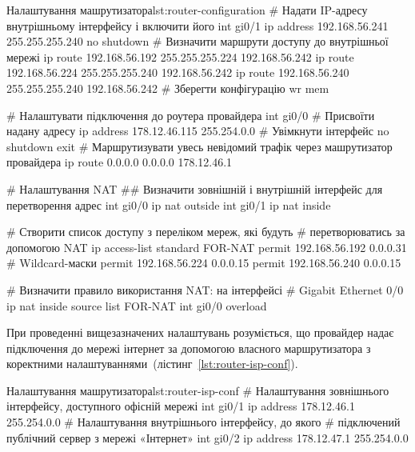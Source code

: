 \documentclass[
  ukrainian,
  simple,
  floatsection,
]{eskdnaukvd}
\begin{document}
      \begin{listingplaintext}{Налаштування машрутизатора}{lst:router-configuration}
        # Надати IP-адресу внутрішньому інтерфейсу і включити його
        int gi0/1
        ip address 192.168.56.241 255.255.255.240
        no shutdown
        # Визначити маршрути доступу до внутрішньої мережі
        ip route 192.168.56.192 255.255.255.224 192.168.56.242
        ip route 192.168.56.224 255.255.255.240 192.168.56.242
        ip route 192.168.56.240 255.255.255.240 192.168.56.242
        # Зберегти конфігурацію
        wr mem

        # Налаштувати підключення до роутера провайдера
        int gi0/0
        # Присвоїти надану адресу
        ip address 178.12.46.115 255.254.0.0
        # Увімкнути інтерфейс
        no shutdown
        exit
        # Маршрутизувати увесь невідомий трафік через машрутизатор провайдера
        ip route 0.0.0.0 0.0.0.0 178.12.46.1


        # Налаштування NAT
        ## Визначити зовнішній і внутрішній інтерфейс для перетворення адрес
        int gi0/0
        ip nat outside
        int gi0/1
        ip nat inside

        # Створити список доступу з переліком мереж, які будуть
        # перетворюватись за допомогою NAT
        ip access-list standard FOR-NAT
        permit 192.168.56.192 0.0.0.31 # Wildcard-маски
        permit 192.168.56.224 0.0.0.15
        permit 192.168.56.240 0.0.0.15

        # Визначити правило використання NAT: на інтерфейсі
        # Gigabit Ethernet 0/0
        ip nat inside source list FOR-NAT int gi0/0 overload
      \end{listingplaintext}

      При проведенні вищезазначених налаштувань розуміється, що провайдер надає підключення до мережі інтернет за допомогою власного маршрутизатора з коректними налаштуваннями~(лістинг~\ref{lst:router-isp-conf}).

      \begin{listingplaintext}{Налаштування машрутизатора}{lst:router-isp-conf}
        # Налаштування зовнішнього інтерфейсу, доступного офісній мережі
        int gi0/1
        ip address 178.12.46.1 255.254.0.0
        # Налаштування внутрішнього інтерфейсу, до якого
        # підключений публічний сервер з мережі «Інтернет»
        int gi0/2
        ip address 178.12.47.1 255.254.0.0
      \end{listingplaintext}
\end{document}

